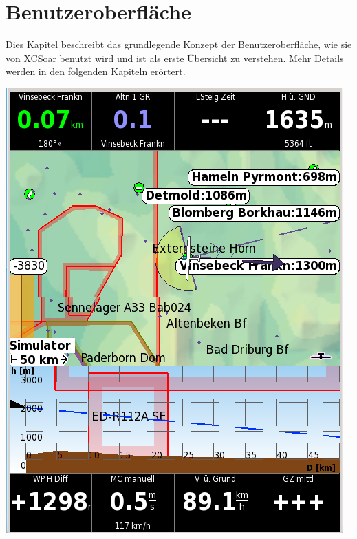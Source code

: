 \chapter{Benutzeroberfläche}\label{cha:interface}

Dies Kapitel beschreibt das grundlegende  Konzept der Benutzeroberfläche, wie sie von \textsf{XCSoar} benutzt wird und ist als erste Übersicht zu verstehen. Mehr Details werden in den folgenden Kapiteln erörtert.

\begin{center}
\includegraphics[angle=0,width=\linewidth,keepaspectratio='true']{figures/plain.png}
\end{center}

